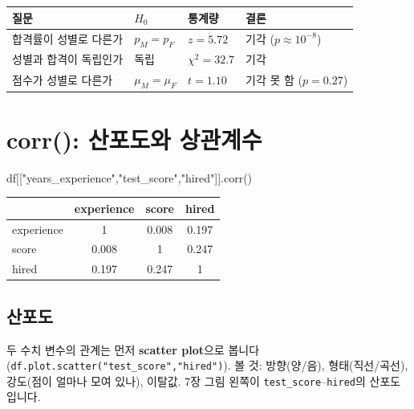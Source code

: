 \documentclass[11pt,a4paper]{article}
\newcommand{\term}[1]{\textbf{#1}}
\newcommand{\code}[1]{\texttt{#1}}
\begin{document}
\begin{hypbox}
\begin{center}
\begin{tabular}{@{}l l l l@{}}
\toprule
질문 & $H_0$ & 통계량 & 결론 \\
\midrule
합격률이 성별로 다른가 & $p_M=p_F$ & $z=5.72$ & 기각 ($p\approx10^{-8}$) \\
성별과 합격이 독립인가 & 독립 & $\chi^2=32.7$ & 기각 \\
점수가 성별로 다른가 & $\mu_M=\mu_F$ & $t=1.10$ & 기각 못 함 ($p=0.27$) \\
\bottomrule
\end{tabular}
\end{center}
\end{hypbox}

\section{corr(): 산포도와 상관계수}

\begin{codebox}
df[["years\_experience","test\_score","hired"]].corr()
\end{codebox}
\begin{center}
\begin{tabular}{@{}l c c c@{}}
\toprule
 & experience & score & hired \\
\midrule
experience & 1 & 0.008 & 0.197 \\
score & 0.008 & 1 & 0.247 \\
hired & 0.197 & 0.247 & 1 \\
\bottomrule
\end{tabular}
\end{center}

\subsection{산포도}
두 수치 변수의 관계는 먼저 \term{scatter plot}으로 봅니다 (\code{df.plot.scatter("test\_score","hired")}). 볼 것: 방향(양/음), 형태(직선/곡선), 강도(점이 얼마나 모여 있나), 이탈값. 7장 그림 왼쪽이 \code{test\_score}–\code{hired}의 산포도입니다.
\end{document}
